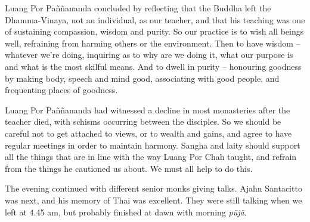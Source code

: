Luang Por Paññananda concluded by reflecting that the Buddha left the
Dhamma-Vinaya, not an individual, as our teacher, and that his teaching
was one of sustaining compassion, wisdom and purity. So our practice is
to wish all beings well, refraining from harming others or the
environment. Then to have wisdom -- whatever we're doing, inquiring as
to why are we doing it, what our purpose is and what is the most skilful
means. And to dwell in purity -- honouring goodness by making body, 
speech and mind good, associating with good people, and frequenting
places of goodness. 

Luang Por Paññananda had witnessed a decline in most monasteries after
the teacher died, with schisms occurring between the disciples. So we
should be careful not to get attached to views, or to wealth and gains, 
and agree to have regular meetings in order to maintain harmony. Sangha
and laity should support all the things that are in line with the way
Luang Por Chah taught, and refrain from the things he cautioned us
about. We must all help to do this. 

The evening continued with different senior monks giving talks. Ajahn
Santacitto was next, and his memory of Thai was excellent. They were
still talking when we left at 4.45 am, but probably finished at dawn
with morning \emph{pūjā}. 

